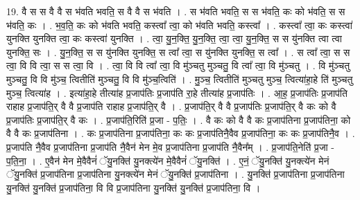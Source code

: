 \documentclass[17pt]{extarticle}
\begin{document}
19. वै स स वै वै स भ॑वति भवति॒ स वै वै स भ॑वति । . स भ॑वति भवति॒ स स भ॑वति॒ कः को भ॑वति॒ स स भ॑वति॒ कः । . भ॒व॒ति॒ कः को भ॑वति भवति॒ कस्त्वा᳚ त्वा॒ को भ॑वति भवति॒ कस्त्वा᳚ । . कस्त्वा᳚ त्वा॒ कः कस्त्वा॑ युनक्ति युनक्ति त्वा॒ कः कस्त्वा॑ युनक्ति । . त्वा॒ यु॒न॒क्ति॒ यु॒न॒क्ति॒ त्वा॒ त्वा॒ यु॒न॒क्ति॒ स स यु॑नक्ति त्वा त्वा युनक्ति॒ सः । . यु॒न॒क्ति॒ स स यु॑नक्ति युनक्ति॒ स त्वा᳚ त्वा॒ स यु॑नक्ति युनक्ति॒ स त्वा᳚ । . स त्वा᳚ त्वा॒ स स त्वा॒ वि वि त्वा॒ स स त्वा॒ वि । . त्वा॒ वि वि त्वा᳚ त्वा॒ वि मु॑ञ्चतु मुञ्चतु॒ वि त्वा᳚ त्वा॒ वि मु॑ञ्चतु । . वि मु॑ञ्चतु मुञ्चतु॒ वि वि मु॑ञ्च॒ त्वितीति॑ मुञ्चतु॒ वि वि मु॑ञ्च॒त्विति॑ । . मु॒ञ्च॒ त्वितीति॑ मुञ्चतु मुञ्च॒ त्वित्या॑हा॒हे ति॑ मुञ्चतु मुञ्च॒ त्वित्या॑ह । . इत्या॑हा॒हे तीत्या॑ह प्र॒जाप॑तिः प्र॒जाप॑ति रा॒हे तीत्या॑ह प्र॒जाप॑तिः । . आ॒ह॒ प्र॒जाप॑तिः प्र॒जाप॑ति राहाह प्र॒जाप॑ति॒र् वै वै प्र॒जाप॑ति राहाह प्र॒जाप॑ति॒र् वै । . प्र॒जाप॑ति॒र् वै वै प्र॒जाप॑तिः प्र॒जाप॑ति॒र् वै कः को वै प्र॒जाप॑तिः प्र॒जाप॑ति॒र् वै कः । . प्र॒जाप॑ति॒रिति॑ प्र॒जा - प॒तिः॒ । . वै कः को वै वै कः प्र॒जाप॑तिना प्र॒जाप॑तिना॒ को वै वै कः प्र॒जाप॑तिना । . कः प्र॒जाप॑तिना प्र॒जाप॑तिना॒ कः कः प्र॒जाप॑तिनै॒वैव प्र॒जाप॑तिना॒ कः कः प्र॒जाप॑तिनै॒व । . प्र॒जाप॑ति नै॒वैव प्र॒जाप॑तिना प्र॒जाप॑ति नै॒वैन॑ मेन मे॒व प्र॒जाप॑तिना प्र॒जाप॑ति नै॒वैन᳚म् । . प्र॒जाप॑ति॒नेति॑ प्र॒जा - प॒ति॒ना॒ । . ए॒वैन॑ मेन मे॒वैवैनं॑ ॅयु॒नक्ति॑ यु॒नक्त्ये॑न मे॒वैवैनं॑ ॅयु॒नक्ति॑ । . ए॒नं॒ ॅयु॒नक्ति॑ यु॒नक्त्ये॑न मेनं ॅयु॒नक्ति॑ प्र॒जाप॑तिना प्र॒जाप॑तिना यु॒नक्त्ये॑न मेनं ॅयु॒नक्ति॑ प्र॒जाप॑तिना । . यु॒नक्ति॑ प्र॒जाप॑तिना प्र॒जाप॑तिना यु॒नक्ति॑ यु॒नक्ति॑ प्र॒जाप॑तिना॒ वि वि प्र॒जाप॑तिना यु॒नक्ति॑ यु॒नक्ति॑ प्र॒जाप॑तिना॒ वि । \newline
\end{document}
